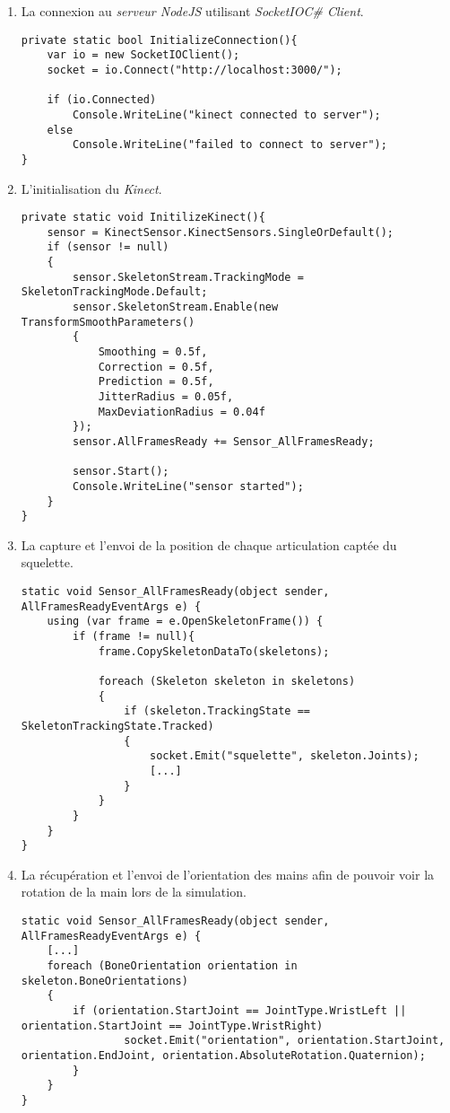 \begin{enumerate}
\item La connexion au \textit{serveur NodeJS} utilisant \textit{SocketIOC\# Client}.
\begin{lstlisting}
private static bool InitializeConnection(){
	var io = new SocketIOClient();
	socket = io.Connect("http://localhost:3000/");
	
	if (io.Connected)
		Console.WriteLine("kinect connected to server"); 
	else
		Console.WriteLine("failed to connect to server");
}
\end{lstlisting}

\item L'initialisation du \textit{Kinect}.
\begin{lstlisting}
private static void InitilizeKinect(){
	sensor = KinectSensor.KinectSensors.SingleOrDefault();
	if (sensor != null)
	{
		sensor.SkeletonStream.TrackingMode = SkeletonTrackingMode.Default;
		sensor.SkeletonStream.Enable(new TransformSmoothParameters()
		{
			Smoothing = 0.5f,
			Correction = 0.5f,
			Prediction = 0.5f,
			JitterRadius = 0.05f,
			MaxDeviationRadius = 0.04f
		});
		sensor.AllFramesReady += Sensor_AllFramesReady;

		sensor.Start();
		Console.WriteLine("sensor started");
	}
}
\end{lstlisting}

\item La capture et l'envoi de la position de chaque articulation captée du squelette.
\begin{lstlisting}
static void Sensor_AllFramesReady(object sender, AllFramesReadyEventArgs e) {
	using (var frame = e.OpenSkeletonFrame()) {
		if (frame != null){
			frame.CopySkeletonDataTo(skeletons);

			foreach (Skeleton skeleton in skeletons)
			{
				if (skeleton.TrackingState == SkeletonTrackingState.Tracked)
				{
					socket.Emit("squelette", skeleton.Joints);
					[...]
				}
			}
		}
	}
}
\end{lstlisting}

\item La récupération et l'envoi de l'orientation des mains afin de pouvoir voir la rotation de la main lors de la simulation.
\begin{lstlisting}
static void Sensor_AllFramesReady(object sender, AllFramesReadyEventArgs e) {
	[...]
	foreach (BoneOrientation orientation in skeleton.BoneOrientations)
	{
		if (orientation.StartJoint == JointType.WristLeft || orientation.StartJoint == JointType.WristRight)
				socket.Emit("orientation", orientation.StartJoint, orientation.EndJoint, orientation.AbsoluteRotation.Quaternion);
		}
	} 
}
\end{lstlisting}
\end{enumerate}

